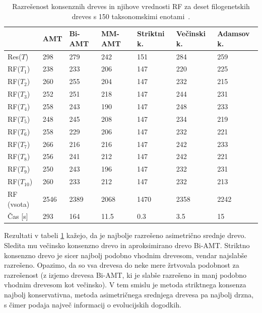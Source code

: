 \documentclass[a4paper, 12pt]{book}
\begin{document}
\begin{table}[h!]
	\begin{center}
	{\footnotesize
	\begin{tabular}{ l| l | l | l | l | l | l }
	
	~            & AMT  & Bi-AMT & MM-AMT  & Striktni k. & Večinski k. & Adamsov k. \\ \hline
	Res($T$)     & 298  & 279    & 242     & 151         & 284         & 259       \\ \hline
	RF($T_1$)    & 238  & 233    & 206     & 147         & 220         & 225       \\ \hline
	RF($T_2$)    & 260  & 255    & 204     & 147         & 232         & 215       \\ \hline
	RF($T_3$)    & 252  & 251    & 218     & 147         & 244         & 231       \\ \hline
	RF($T_4$)    & 258  & 243    & 190     & 147         & 248         & 233       \\ \hline
	RF($T_5$)    & 248  & 245    & 208     & 147         & 234         & 219       \\ \hline
	RF($T_6$)    & 258  & 229    & 206     & 147         & 232         & 221       \\ \hline
	RF($T_7$)    & 266  & 216    & 216     & 147         & 242         & 233       \\ \hline
	RF($T_8$)    & 256  & 241    & 212     & 147         & 242         & 221       \\ \hline
	RF($T_9$)    & 250  & 243    & 196     & 147         & 232         & 231       \\ \hline
	RF($T_{10}$) & 260  & 233    & 212     & 147         & 232         & 213       \\ \hline
	RF (vsota)   & 2546 & 2389   & 2068    & 1470        & 2358        & 2242      \\ \hline
	Čas [s]      & 293  & 164    & 11.5    & 0.3         & 3.5         & 15        \\ \hline 
	\end{tabular}
	\caption{\label{table-eval-alge}
	 Razrešenost konsenznih dreves in njihove vrednosti RF za deset filogenetskih dreves
	 s 150 taksonomskimi enotami~\cite{taxa150}.
	 }
	}
	\end{center}		
\end{table}
\clearpage
Rezultati v tabeli \ref{table-eval-alge} kažejo, da je najbolje razrešeno asimetrično
srednje drevo. Sledita mu večinsko konsenzno drevo in aproksimirano drevo Bi-AMT. 
Striktno konsenzno drevo je sicer najbolj podobno vhodnim drevesom, vendar najslabše 
razrešeno. Opazimo, da so vsa drevesa do neke mere žrtvovala podobnost za razrešenost
(z izjemo drevesa Bi-AMT, ki je slabše razrešeno in manj podobno vhodnim drevesom kot
večinsko). V tem smislu je metoda striktnega konsenza najbolj konservativna, 
metoda asimetričnega srednjega drevesa pa najbolj drzna, s čimer podaja največ informacij 
o evolucijskih dogodkih. 
\end{document}
